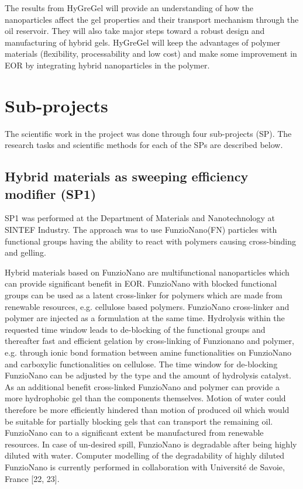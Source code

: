 The results from HyGreGel will provide an understanding of how the nanoparticles affect the gel properties and their transport mechanism through the oil reservoir. They will also take major steps toward a robust design and manufacturing of hybrid gels. HyGreGel will keep the advantages of polymer materials (flexibility, processability and low cost) and make some improvement in EOR by integrating hybrid nanoparticles in the polymer. 

\section{Sub-projects}
The scientific work in the project was done through four sub-projects (SP). The research tasks and scientific methods for each of the SPs are described below.
\subsection{Hybrid materials as sweeping efficiency modifier (SP1)}
SP1 was performed at the Department of Materials and Nanotechnology at SINTEF Industry. The approach was to use FunzioNano\texttrademark (FN) particles with functional groups having the ability to react with polymers causing cross-binding and gelling. 

Hybrid materials based on FunzioNano are multifunctional nanoparticles which can provide significant benefit in EOR. FunzioNano with blocked functional groups can be used as a latent cross-linker for polymers which are made from renewable resources, e.g. cellulose based polymers. FunzioNano cross-linker and polymer are injected as a formulation at the same time. Hydrolysis within the requested time window leads to de-blocking of the functional groups and thereafter fast and efficient gelation by cross-linking of Funzionano and polymer, e.g. through ionic bond formation between amine functionalities on FunzioNano and carboxylic functionalities on cellulose. The time window for de-blocking FunzioNano can be adjusted by the type and the amount of hydrolysis catalyst. As an additional benefit cross-linked FunzioNano and polymer can provide a more hydrophobic gel than the components themselves. Motion of water could therefore be more efficiently hindered than motion of produced oil which would be suitable for partially blocking gels that can transport the remaining oil. FunzioNano can to a significant extent be manufactured from renewable resources. In case of un-desired spill, FunzioNano is degradable after being highly diluted with water. Computer modelling of the degradability of highly diluted FunzioNano is currently performed in collaboration with Université de Savoie, France [22, 23].



